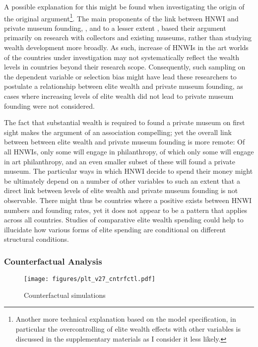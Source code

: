 \documentclass[11pt]{article}
\begin{document}
A possible explanation for this might be found when investigating the origin of the original argument\footnote{Another more technical explanation based on the model specification, in particular the overcontrolling of elite wealth effects with other variables is discussed in the supplementary materials as I consider it less likely.}.
The main proponents of the link between HNWI and private museum founding, \textcite{Gnyp_2015_collectors}, \textcite{Zorloni_Resch_2016_opportunities} and to a lesser extent \textcite{Walker_2019_collector}, based their argument primarily on research with collectors and existing museums, rather than studying wealth development more broadly.
As such, increase of HNWIs in the art worlds of the countries under investigation may not systematically reflect the wealth levels in countries beyond their research scope.  
Consequently, such sampling on the dependent variable or selection bias might have lead these researchers to postulate a relationship between elite wealth and private museum founding, as cases where increasing levels of elite wealth did not lead to private museum founding were not considered. 


The fact that substantial wealth is required to found a private museum on first sight makes the argument of an association compelling; yet the overall link between between elite wealth and private museum founding is more remote: 
Of all HNWIs, only some will engage in philanthropy, of which only some will engage in art philanthropy, and  an even smaller subset of these will found a private museum.
The particular ways in which HNWI decide to spend their money might be ultimately depend on a number of other variables to such an extent that a direct link between levels of elite wealth and private museum founding is not observable.
There might thus be countries where a positive exists between HNWI numbers and founding rates, yet it does not appear to be a pattern that applies across all countries. 
Studies of comparative elite wealth spending could help to illucidate how various forms of elite spending are conditional on different structural conditions.








\subsubsection*{Counterfactual Analysis}

\begin{figure}[htbp]
\centering
\texttt{[image: figures/plt\_v27\_cntrfctl.pdf]}
\caption{\label{fig:cntrfctl}Counterfactual simulations}
\end{figure}
\end{document}
